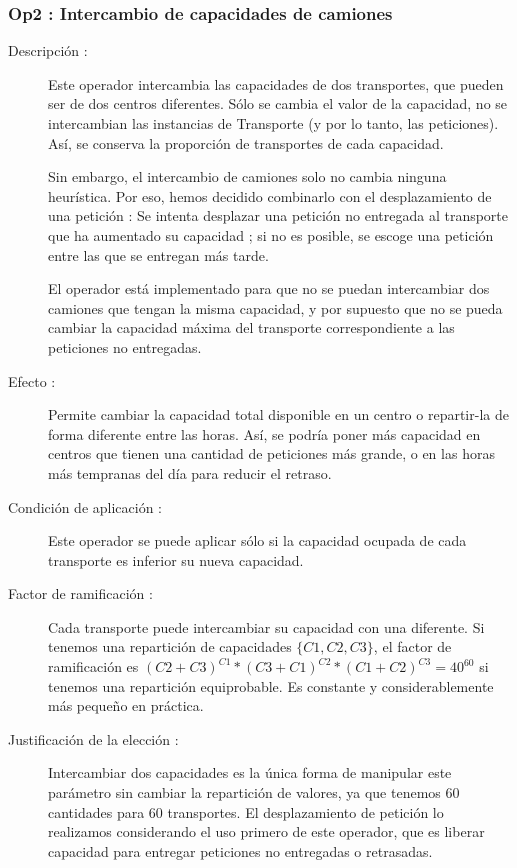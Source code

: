 \documentclass{article}
\begin{document}
\subsubsection{Op2 : Intercambio de capacidades de camiones}

\begin{description}
\item[Descripción :] Este operador intercambia las capacidades de dos
transportes, que pueden ser de dos centros diferentes. Sólo se cambia el valor
de la capacidad, no se intercambian las instancias de Transporte (y por lo
tanto, las peticiones). Así, se conserva la proporción de transportes de cada
capacidad. 

Sin embargo, el intercambio de camiones solo no cambia ninguna heurística. Por
eso, hemos decidido combinarlo con el desplazamiento de una petición : Se
intenta desplazar una petición no entregada al transporte que ha aumentado su
capacidad ; si no es posible, se escoge una petición entre las que se entregan
más tarde.

El operador está implementado para que no se puedan intercambiar dos camiones
que tengan la misma capacidad, y por supuesto que no se pueda cambiar la
capacidad máxima del transporte correspondiente a las peticiones no entregadas.
\item[Efecto :] Permite cambiar la capacidad total disponible en un centro o
repartir-la de forma diferente entre las horas. Así, se podría poner más
capacidad en centros que tienen una cantidad de peticiones más grande, o en las
horas más tempranas del día para reducir el retraso.
\item[Condición de aplicación :] Este operador se puede aplicar sólo si la
capacidad ocupada de cada transporte es inferior su nueva capacidad. 
\item[Factor de ramificación :] Cada transporte puede intercambiar su capacidad
con una diferente. Si tenemos una repartición de capacidades $\{C1,C2,C3\}$, el
factor de ramificación es $(C2+C3)^{C1}*(C3+C1)^{C2}*(C1+C2)^{C3} = 40^{60}$ si
tenemos una repartición equiprobable. Es constante y considerablemente más
pequeño en práctica.
\item[Justificación de la elección :] Intercambiar dos capacidades es la única
forma de manipular este parámetro sin cambiar la repartición de valores, ya que
tenemos 60 cantidades para 60 transportes. El desplazamiento de petición lo
realizamos considerando el uso primero de este operador, que es liberar
capacidad para entregar peticiones no entregadas o retrasadas.
\end{description}
\end{document}
